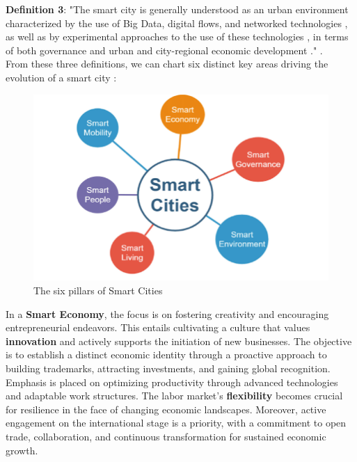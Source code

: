 \textbf{Definition 3}: "The smart city is generally understood as an urban environment characterized by the use of Big Data, digital flows, and networked technologies \cite{kitchin2014real, townsend2013smart}, as well as by experimental approaches to the use of these technologies \cite{luque2015developing, tironi2018acknowledging}, in terms of both governance \cite{cowley2018smart, cowley2019smart} and urban and city-regional economic development \cite{caragliu2013smart}." \cite{Caprotti2022}.
\\

From these three definitions, we can chart six distinct key areas driving the evolution of a smart city \cite{foo2}:

\begin{figure}
\centering
\includegraphics[width=0.7\columnwidth]{images/The-six-pillars-of-Smart-Cities-based-on-8.png}
\caption{The six pillars of Smart Cities \cite{foo3}}
\end{figure}


    

    
 
In a \textbf{Smart Economy}, the focus is on fostering creativity and encouraging entrepreneurial endeavors. This entails cultivating a culture that values \textbf{innovation} and actively supports the initiation of new businesses. The objective is to establish a distinct economic identity through a proactive approach to building trademarks, attracting investments, and gaining global recognition.
Emphasis is placed on optimizing productivity through advanced technologies and adaptable work structures. The labor market's \textbf{flexibility} becomes crucial for resilience in the face of changing economic landscapes. Moreover, active engagement on the international stage is a priority, with a commitment to open trade, collaboration, and continuous transformation for sustained economic growth.

